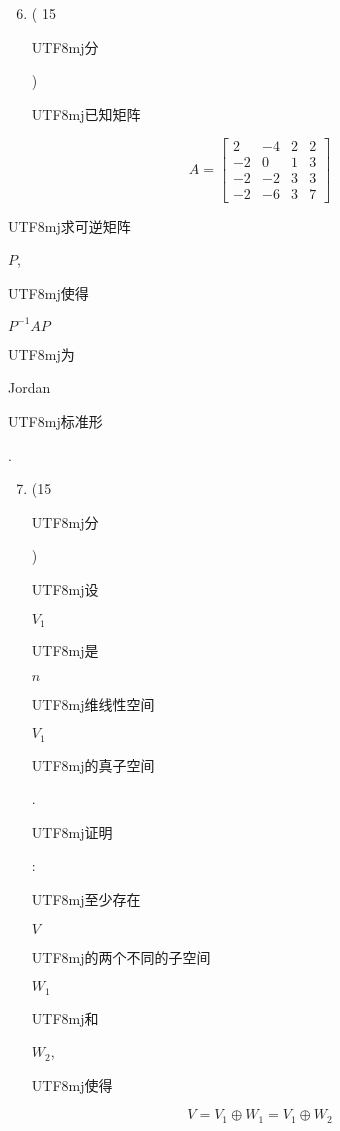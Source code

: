 \documentclass[10pt]{article}
\begin{document}
\begin{enumerate}
  \setcounter{enumi}{5}
  \item ( 15 \begin{CJK}{UTF8}{mj}分\end{CJK}) \begin{CJK}{UTF8}{mj}已知矩阵\end{CJK}
\end{enumerate}
$$
A=\left[\begin{array}{cccc}
2 & -4 & 2 & 2 \\
-2 & 0 & 1 & 3 \\
-2 & -2 & 3 & 3 \\
-2 & -6 & 3 & 7
\end{array}\right]
$$
\begin{CJK}{UTF8}{mj}求可逆矩阵\end{CJK} $P$, \begin{CJK}{UTF8}{mj}使得\end{CJK} $P^{-1} A P$ \begin{CJK}{UTF8}{mj}为\end{CJK} Jordan \begin{CJK}{UTF8}{mj}标准形\end{CJK}.

\begin{enumerate}
  \setcounter{enumi}{6}
  \item (15 \begin{CJK}{UTF8}{mj}分\end{CJK}) \begin{CJK}{UTF8}{mj}设\end{CJK} $V_{1}$ \begin{CJK}{UTF8}{mj}是\end{CJK} $n$ \begin{CJK}{UTF8}{mj}维线性空间\end{CJK} $V_{1}$ \begin{CJK}{UTF8}{mj}的真子空间\end{CJK}. \begin{CJK}{UTF8}{mj}证明\end{CJK}: \begin{CJK}{UTF8}{mj}至少存在\end{CJK} $V$ \begin{CJK}{UTF8}{mj}的两个不同的子空间\end{CJK} $W_{1}$ \begin{CJK}{UTF8}{mj}和\end{CJK} $W_{2}$, \begin{CJK}{UTF8}{mj}使得\end{CJK}
\end{enumerate}
$$
V=V_{1} \oplus W_{1}=V_{1} \oplus W_{2}
$$
\end{document}

